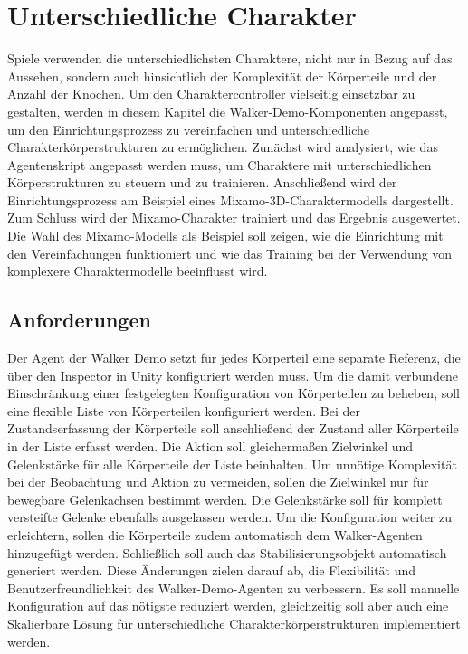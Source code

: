 \section{Unterschiedliche Charakter}
Spiele verwenden die unterschiedlichsten Charaktere, nicht nur in Bezug auf das Aussehen, sondern auch hinsichtlich der Komplexität der Körperteile und der Anzahl der Knochen. Um den Charaktercontroller vielseitig einsetzbar zu gestalten, werden in diesem Kapitel die Walker-Demo-Komponenten angepasst, um den Einrichtungsprozess zu vereinfachen und unterschiedliche Charakterkörperstrukturen zu ermöglichen. Zunächst wird analysiert, wie das Agentenskript angepasst werden muss, um Charaktere mit unterschiedlichen Körperstrukturen zu steuern und zu trainieren. Anschließend wird der Einrichtungsprozess am Beispiel eines Mixamo-3D-Charaktermodells dargestellt. Zum Schluss wird der Mixamo-Charakter trainiert und das Ergebnis ausgewertet. Die Wahl des Mixamo-Modells als Beispiel soll zeigen, wie die Einrichtung mit den Vereinfachungen funktioniert und wie das Training bei der Verwendung von komplexere Charaktermodelle beeinflusst wird.

\subsection{Anforderungen}	
Der Agent der Walker Demo setzt für jedes Körperteil eine separate Referenz, die über den Inspector in Unity konfiguriert werden muss. Um die damit verbundene Einschränkung einer festgelegten Konfiguration von Körperteilen zu beheben, soll eine flexible Liste von Körperteilen konfiguriert werden. Bei der Zustandserfassung der Körperteile soll anschließend der Zustand aller Körperteile in der Liste erfasst werden. Die Aktion soll gleichermaßen Zielwinkel und Gelenkstärke für alle Körperteile der Liste beinhalten. Um unnötige Komplexität bei der Beobachtung und Aktion zu vermeiden, sollen die Zielwinkel nur für bewegbare Gelenkachsen bestimmt werden. Die Gelenkstärke soll für komplett versteifte Gelenke ebenfalls ausgelassen werden. Um die Konfiguration weiter zu erleichtern, sollen die Körperteile zudem automatisch dem Walker-Agenten hinzugefügt werden. Schließlich soll auch das Stabilisierungsobjekt automatisch generiert werden. Diese Änderungen zielen darauf ab, die Flexibilität und Benutzerfreundlichkeit des Walker-Demo-Agenten zu verbessern. Es soll manuelle Konfiguration auf das nötigste reduziert werden, gleichzeitig soll aber auch eine Skalierbare Lösung für unterschiedliche Charakterkörperstrukturen implementiert werden.

